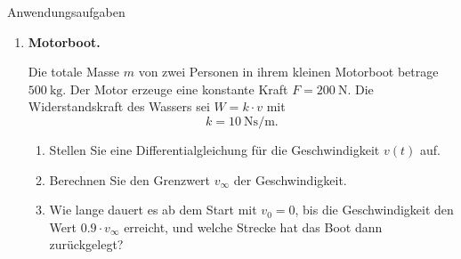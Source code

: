 \clearpage
\begin{ueb}{Anwendungsaufgaben}{}

    \begin{enumerate}




        \item \textbf{Motorboot.}

              Die totale Masse \(m\) von zwei Personen in ihrem kleinen Motorboot betrage
              \(\SI{500}{\kilogram}\). Der Motor erzeuge eine konstante Kraft
              \(F=\SI{200}{\newton}\). Die Widerstandskraft des Wassers sei
              \(W=k\cdot v\) mit
              \[
                  k=\SI{10}{\newton\second\per\meter}.
              \]

              \begin{enumerate}
                  \item Stellen Sie eine Differentialgleichung für die Geschwindigkeit
                        \(v(t)\) auf.

                  \item Berechnen Sie den Grenzwert \(v_\infty\) der Geschwindigkeit.

                  \item Wie lange dauert es ab dem Start mit \(v_0=0\), bis die
                        Geschwindigkeit den Wert \(0.9\cdot v_\infty\) erreicht,
                        und welche Strecke hat das Boot dann zurückgelegt?
              \end{enumerate}





\end{enumerate}
\end{ueb}
